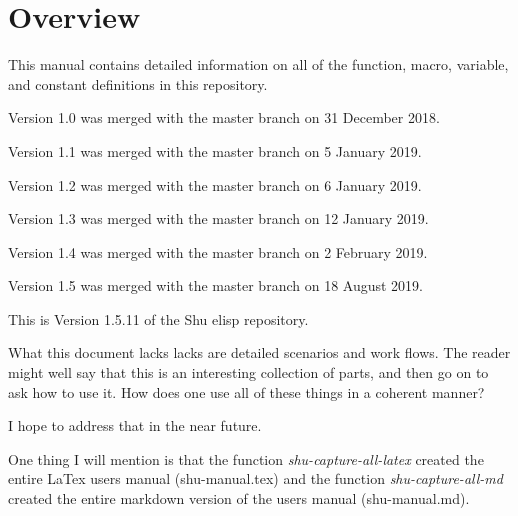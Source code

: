 



\section{Overview}


This manual contains detailed information on all of the function, macro,
variable, and constant definitions in this repository.

Version 1.0 was merged with the master branch on 31 December 2018.

Version 1.1 was merged with the master branch on 5 January 2019.

Version 1.2 was merged with the master branch on 6 January 2019.

Version 1.3 was merged with the master branch on 12 January 2019.

Version 1.4 was merged with the master branch on 2 February 2019.

Version 1.5 was merged with the master branch on 18 August 2019.

This is Version 1.5.11 of the Shu elisp repository.

What this document lacks lacks are detailed scenarios and work flows.  The
reader might well say that this is an interesting collection of parts, and
then go on to ask how to use it.  How does one use all of these things in a
coherent manner?

I hope to address that in the near future.

One thing I will mention is that the function \emph{shu-capture-all-latex} created
the entire LaTex users manual (shu-manual.tex) and the function
\emph{shu-capture-all-md} created the entire markdown version of the users manual
(shu-manual.md).



